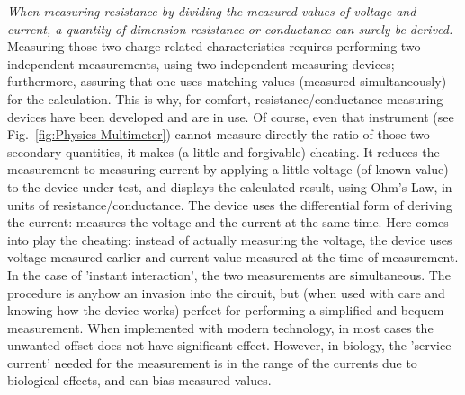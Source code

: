 {
\textit{When measuring resistance by dividing the measured values of voltage and current,
a quantity of dimension resistance or conductance can surely be derived.}
Measuring those two charge-related characteristics
requires performing two independent measurements,
using two independent measuring devices; furthermore, assuring that one uses
matching values (measured simultaneously) for the calculation. This is why, for comfort, resistance/conductance
measuring devices have been developed and are in use.
Of course, even that instrument (see Fig.~\ref{fig:Physics-Multimeter}) cannot measure directly the ratio of
those two secondary quantities, it makes (a little and forgivable) cheating. It reduces the measurement to measuring current 
by applying a little voltage (of known value) to the device under test,
and displays the calculated result, using Ohm's Law, in units of resistance/conductance.
The device uses the differential form of 
deriving the current: measures 
the voltage and the current at the 
same time. Here comes into play the cheating: instead of actually measuring the voltage, the device uses voltage measured earlier and current value measured at the time of measurement.
In the case of 'instant interaction', the two measurements are simultaneous.
The procedure is anyhow an invasion into the circuit, but
(when used with care and knowing how the device works) 
perfect for performing a simplified and bequem measurement.
When implemented with modern technology, in most cases 
the unwanted offset does not have significant effect.
However, in biology, the 'service current' needed for the measurement 
is in the range of the currents due to biological effects,
and can bias measured values.
}

